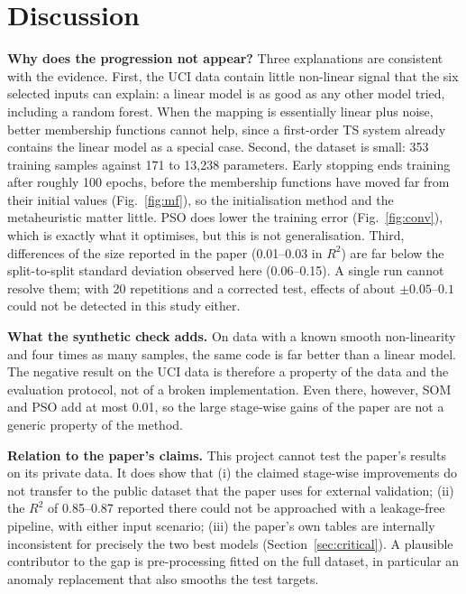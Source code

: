 \documentclass[conference]{IEEEtran}
\newcommand{\tab}[1]{}
\newcommand{\Rsq}{$R^2$}
\begin{document}
\begin{table}[t]
\caption{Paper's final architecture (baseline) vs.\ equal-weight PANFIS without attention (simplified), means over 20 splits}
\label{tab:summary}
\centering
\resizebox{0.95\columnwidth}{!}{\tab{summary_baseline_vs_proposed}}
\end{table}

\section{Discussion}
\textbf{Why does the progression not appear?} Three explanations are consistent with the evidence. First, the UCI data contain little non-linear signal that the six selected inputs can explain: a linear model is as good as any other model tried, including a random forest. When the mapping is essentially linear plus noise, better membership functions cannot help, since a first-order TS system already contains the linear model as a special case. Second, the dataset is small: 353 training samples against 171 to 13,238 parameters. Early stopping ends training after roughly 100 epochs, before the membership functions have moved far from their initial values (Fig.~\ref{fig:mf}), so the initialisation method and the metaheuristic matter little. PSO does lower the training error (Fig.~\ref{fig:conv}), which is exactly what it optimises, but this is not generalisation. Third, differences of the size reported in the paper (0.01--0.03 in \Rsq{}) are far below the split-to-split standard deviation observed here (0.06--0.15). A single run cannot resolve them; with 20 repetitions and a corrected test, effects of about $\pm0.05$--$0.1$ could not be detected in this study either.

\textbf{What the synthetic check adds.} On data with a known smooth non-linearity and four times as many samples, the same code is far better than a linear model. The negative result on the UCI data is therefore a property of the data and the evaluation protocol, not of a broken implementation. Even there, however, SOM and PSO add at most 0.01, so the large stage-wise gains of the paper are not a generic property of the method.

\textbf{Relation to the paper's claims.} This project cannot test the paper's results on its private data. It does show that (i) the claimed stage-wise improvements do not transfer to the public dataset that the paper uses for external validation; (ii) the \Rsq{} of 0.85--0.87 reported there could not be approached with a leakage-free pipeline, with either input scenario; (iii) the paper's own tables are internally inconsistent for precisely the two best models (Section~\ref{sec:critical}). A plausible contributor to the gap is pre-processing fitted on the full dataset, in particular an anomaly replacement that also smooths the test targets.
\end{document}
